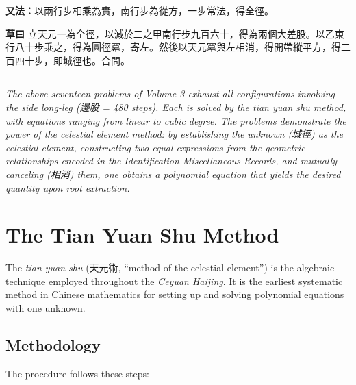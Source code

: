 \documentclass[11pt,a4paper]{article}
\newcommand{\workings}[1]{\par\noindent\textbf{草曰} #1\par}
\begin{document}
\vspace{0.3cm}

\noindent\textbf{又法：}以兩行步相乘為實，南行步為從方，一步常法，得全徑。

\workings{立天元一為全徑，以減於二之甲南行步九百六十，得為兩個大差股。以乙東行八十步乘之，得為圓徑冪，寄左。然後以天元冪與左相消，得開帶縱平方，得二百四十步，即城徑也。合問。}

\vspace{0.5cm}

\noindent\textcolor{rulecolor}{\rule{\textwidth}{0.4pt}}

\textit{The above seventeen problems of Volume 3 exhaust all configurations involving the side long-leg (邊股 = 480 steps). Each is solved by the tian yuan shu method, with equations ranging from linear to cubic degree. The problems demonstrate the power of the celestial element method: by establishing the unknown (城徑) as the celestial element, constructing two equal expressions from the geometric relationships encoded in the Identification Miscellaneous Records, and mutually canceling (相消) them, one obtains a polynomial equation that yields the desired quantity upon root extraction.}

\newpage

\section{The Tian Yuan Shu Method}
\label{sec:tianyuan}

The \textit{tian yuan shu} (天元術, ``method of the celestial element'') is the algebraic technique employed throughout the \textit{Ceyuan Haijing}. It is the earliest systematic method in Chinese mathematics for setting up and solving polynomial equations with one unknown.

\subsection{Methodology}

The procedure follows these steps:
\end{document}
